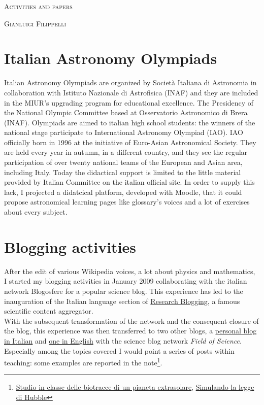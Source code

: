 \documentclass[a4paper]{article}
\begin{document}
\pagestyle{empty}

\begin{center}
	\huge{\textsc{Activities and papers}}
	\vspace{\baselineskip}
	
	\Large{\textsc{Gianluigi Filippelli}}
\end{center}
\vspace{1.5\baselineskip}

\section{Italian Astronomy Olympiads}
Italian Astronomy Olympiads are organized by Societ\`a Italiana di Astronomia in collaboration with Istituto Nazionale di Astrofisica (INAF) and they are included in the MIUR's upgrading program for educational excellence. The Presidency of the National Olympic Committee based at Osservatorio Astronomico di Brera (INAF). Olympiads are aimed to italian high school students: the winners of the national stage participate to International Astronomy Olympiad (IAO). IAO officially born in 1996 at the initiative of Euro-Asian Astronomical Society. They are held every year in autumn, in a different country, and they see the regular participation of over twenty national teams of the European and Asian area, including Italy. Today the didactical support is limited to the little material provided by Italian Committee on the italian official site. In order to supply this lack, I projected a didatcical platform, developed with Moodle, that it could propose astronomical learning pages like glossary's voices and a lot of exercises about every subject.

\section{Blogging activities}
After the edit of various Wikipedia voices, a lot about physics and mathematics, I started my blogging activities in January 2009 collaborating with the italian network Blogosfere for a popular science blog. This experience has led to the inauguration of the Italian language section of \href{http://researchblogging.org/}{Research Blogging}, a famous scientific content aggregator.\\
With the subsequent transformation of the network and the consequent closure of the blog, this experience was then transferred to two other blogs, a \href{http://dropseaofulaula.blogspot.it/}{personal blog in Italian} and \href{http://docmadhattan.fieldofscience.com/}{one in English} with the science blog network {\em Field of Science}. Especially among the topics covered I would point a series of posts within teaching: some examples are reported in the note\footnote{\href{http://dropseaofulaula.blogspot.it/2012/09/studio-in-classe-delle-biotracce-di-un.html}{Studio in classe delle biotracce di un pianeta extrasolare}, \href{http://dropseaofulaula.blogspot.it/2011/09/simulando-la-legge-di-hubble.html}{Simulando la legge di Hubble}}.
\end{document}
